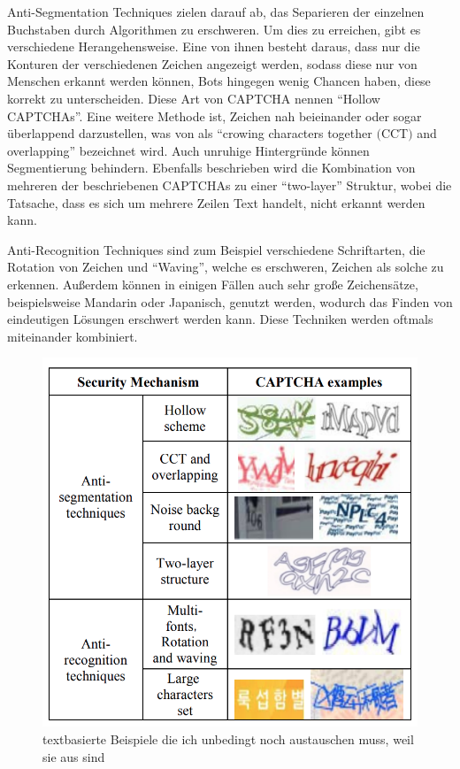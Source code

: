 Anti-Segmentation Techniques zielen darauf ab, das Separieren der einzelnen Buchstaben durch Algorithmen zu erschweren. 
Um dies zu erreichen, gibt es verschiedene Herangehensweise.
Eine von ihnen besteht daraus, dass nur die Konturen der verschiedenen Zeichen angezeigt werden, sodass diese nur von Menschen erkannt werden können,
Bots hingegen wenig Chancen haben, diese korrekt zu unterscheiden. Diese Art von CAPTCHA nennen \citeauthor[p.76]{surveyofresearch} ``Hollow CAPTCHAs''. %
Eine weitere Methode ist, Zeichen nah beieinander oder sogar überlappend darzustellen, 
was von \citeauthor{surveyofresearch} als ``crowing characters together $($CCT$)$ and overlapping'' bezeichnet wird.
Auch unruhige Hintergründe können Segmentierung behindern.
Ebenfalls beschrieben wird die Kombination von mehreren der beschriebenen CAPTCHAs zu einer ``two-layer'' Struktur,
wobei die Tatsache, dass es sich um mehrere Zeilen Text handelt, nicht erkannt werden kann. \cite[p.76]{surveyofresearch}

Anti-Recognition Techniques sind zum Beispiel verschiedene Schriftarten, die Rotation von Zeichen und ``Waving'', 
welche es erschweren, Zeichen als solche zu erkennen. 
Außerdem können in einigen Fällen auch sehr große Zeichensätze, beispielsweise Mandarin oder Japanisch, genutzt werden, 
wodurch das Finden von eindeutigen Lösungen erschwert werden kann.
Diese Techniken werden oftmals miteinander kombiniert.
\cite[p.77]{surveyofresearch}

\begin{figure}
    \centering
    \includegraphics{gfx/mygraphics/unbedingtaustauschen1.png}
    \caption{textbasierte Beispiele die ich unbedingt noch austauschen muss, weil sie aus \cite{surveyofresearch} sind}
\end{figure}

